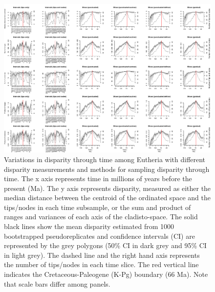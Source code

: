 \begin{landscape}
\begin{figure}[!htbp]
\centering
    \includegraphics[width=\textwidth,height=\textheight,keepaspectratio]{Supplementaries/Figures/STD/Eutheria_all_methods.pdf}
\caption[Comparison of all the disparity metrics and all the time sampling methods for Eutheria]{Variations in disparity through time among Eutheria with different disparity measurements and methods for sampling disparity through time. The x axis represents time in millions of years before the present (Ma). The y axis represents disparity, measured as either the median distance between the centroid of the ordinated space and the tips/nodes in each time subsample, or the sum and product of ranges and variances of each axis of the cladisto-space. The solid black lines show the mean disparity estimated from 1000 bootstrapped pseudoreplicates and confidence intervals (CI) are represented by the grey polygons (50\% CI in dark grey and 95\% CI in light grey). The dashed line and the right hand axis represents the number of tips/nodes in each time slice. The red vertical line indicates the Cretaceous-Paleogene (K-Pg) boundary (66 Ma). Note that scale bars differ among panels.}
\label{Supp_disparity_all_Eutheria}
\end{figure}
\end{landscape}

